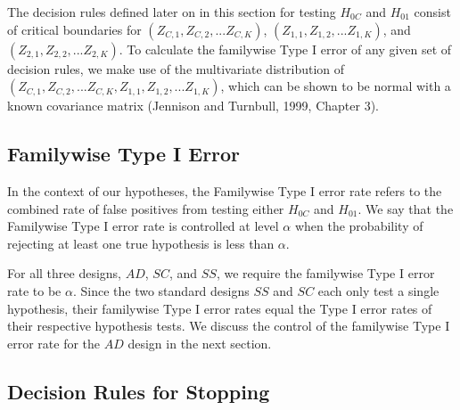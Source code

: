 \documentclass{article}
\begin{document}
The decision rules defined later on in this section for testing $H_{0C}$ and $H_{01}$ consist of critical boundaries for $(Z_{C,1},Z_{C,2},...Z_{C,K})$, $(Z_{1,1},Z_{1,2},...Z_{1,K})$, and $(Z_{2,1},Z_{2,2},...Z_{2,K})$. To calculate the familywise Type I error of any given set of decision rules, we make use of the multivariate distribution of $(Z_{C,1},Z_{C,2},... Z_{C,K}, Z_{1,1},Z_{1,2},...Z_{1,K})$, which can be shown to be normal with a known covariance matrix (Jennison and Turnbull, 1999, Chapter 3)\cite{JennisonTurnbullBook}.



\subsection*{Familywise Type I Error}

In the context of our hypotheses, the Familywise Type I error rate refers to the combined rate of false positives from testing either $H_{0C}$ and $H_{01}$. We say that the Familywise Type I error rate is controlled at level $α$ when the probability of rejecting at least one true hypothesis is less than $α$.

For all three designs, $AD$, $SC$, and $SS$, we require the familywise Type I error rate to be $α$. Since the two standard designs $SS$ and $SC$ each only test a single hypothesis, their familywise Type I error rates equal the Type I error rates of their respective hypothesis tests. We discuss the control of the familywise Type I error rate for the $AD$ design in the next section.




\subsection*{Decision Rules for Stopping}
\end{document}
